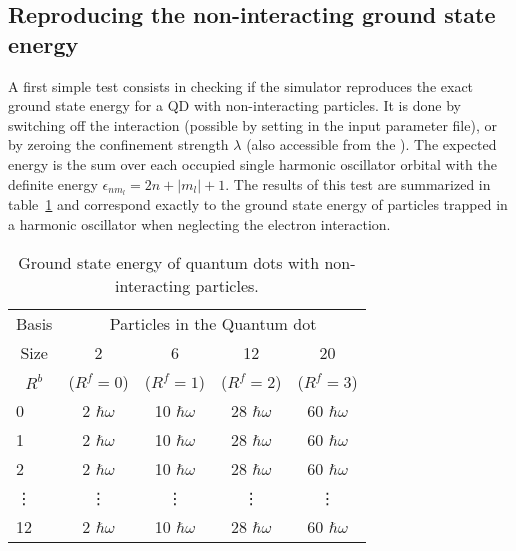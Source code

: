 \subsection{Reproducing the non-interacting ground state energy}
A first simple test consists in checking if the simulator reproduces the exact ground state energy for a QD with non-interacting particles. It is done by switching off the interaction (possible by setting  in the input parameter file), or by zeroing the confinement strength $\lambda$ (also accessible from the ). The expected energy is the sum over each occupied single harmonic oscillator orbital with the definite energy $\epsilon_{n m_l}=2n+ |m_l|+1$.
The results of this test are summarized in table~\ref{table:nonInteractEnergies} and correspond exactly to the ground state energy of particles trapped in a harmonic oscillator when neglecting the electron interaction.
\begin{table}[ht]
\centering      %
\begin{tabular}{l|c|c|c|c}  %
\toprule[1pt]  
\multicolumn{1}{c|}{Basis} &\multicolumn{4}{c}{Particles in the Quantum dot} \\
\multicolumn{1}{c|}{Size} & \multicolumn{1}{|c|}{2}& \multicolumn{1}{|c}{6} & \multicolumn{1}{|c|}{12}& \multicolumn{1}{|c}{20}\\ [0.7ex]  %
\multicolumn{1}{c|}{$R^b$} & \multicolumn{1}{|c|}{($R^f=0$)}& \multicolumn{1}{|c}{($R^f=1$)} & \multicolumn{1}{|c|}{($R^f=2$)}& \multicolumn{1}{|c}{($R^f=3$)}\\ [0.7ex]  %
\hline                    %
 0 & 2 $\hbar \omega$ & 10 $\hbar \omega$ & 28 $\hbar \omega$ & 60 $\hbar \omega$ \\
1 & 2 $\hbar \omega$ & 10 $\hbar \omega$ & 28 $\hbar \omega$ & 60 $\hbar \omega$ \\
2 & 2 $\hbar \omega$ & 10 $\hbar \omega$ & 28 $\hbar \omega$ & 60 $\hbar \omega$ \\
\vdots & \vdots &\vdots &\vdots &\vdots \\
12 & 2 $\hbar \omega$ & 10 $\hbar \omega$ & 28 $\hbar \omega$ & 60 $\hbar \omega$  \\
\hline   
\hline  
\end{tabular}
 \caption{Ground state energy of quantum dots with non-interacting particles.}
\label{table:nonInteractEnergies} 
\end{table} 

